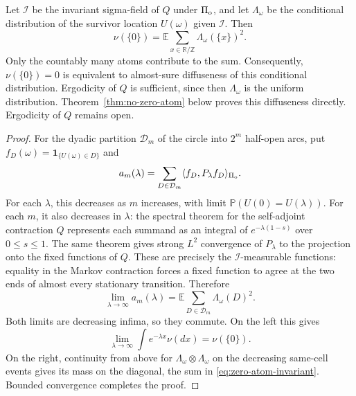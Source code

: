 \documentclass[11pt,letterpaper]{article}
\newcommand{\PP}{\mathbb P}\newcommand{\EE}{\mathbb E}
\newcommand{\T}{\mathbb R/\mathbb Z}\newcommand{\Leb}{\operatorname{Leb}}
\newcommand{\ind}{\mathbf 1}\newcommand{\Exp}{\operatorname{Exp}}
\begin{document}
\begin{corollary}
\label{cor:zero-atom-invariant}
Let $\mathcal I$ be the invariant sigma-field of $Q$ under
$\Pi_{\rm o}$, and let $\Lambda_\omega$ be the conditional distribution
of the survivor location $U(\omega)$ given $\mathcal I$. Then
\begin{equation}\label{eq:zero-atom-invariant}
 \nu(\{0\})=
 \EE\sum_{x\in\T}\Lambda_\omega(\{x\})^2.
\end{equation}
Only the countably many atoms contribute to the sum. Consequently,
$\nu(\{0\})=0$ is equivalent to almost-sure diffuseness of this
conditional distribution. Ergodicity of $Q$ is sufficient, since
then $\Lambda_\omega$ is the uniform distribution.
Theorem~\ref{thm:no-zero-atom} below proves this diffuseness directly.
Ergodicity of $Q$ remains open.
\end{corollary}
\begin{proof}
For the dyadic partition $\mathcal D_m$ of the circle into $2^m$
half-open arcs, put $f_D(\omega)=\ind_{\{U(\omega)\in D\}}$ and
\[
 a_m(\lambda)=\sum_{D\in\mathcal D_m}
                   \langle f_D,P_\lambda f_D\rangle_{\Pi_{\rm o}}.
\]
For each $\lambda$, this decreases as $m$ increases, with limit
$\PP(U(0)=U(\lambda))$. For each $m$, it also decreases in $\lambda$:
the spectral theorem for the self-adjoint contraction $Q$ represents
each summand as an integral of $e^{-\lambda(1-s)}$ over $0\le s\le1$.
The same theorem gives strong $L^2$ convergence of $P_\lambda$ to the
projection onto the fixed functions of $Q$. These are precisely the
$\mathcal I$-measurable functions: equality in the Markov contraction
forces a fixed function to agree at the two ends of almost every
stationary transition. Therefore
\[
 \lim_{\lambda\to\infty}a_m(\lambda)
       =\EE\sum_{D\in\mathcal D_m}\Lambda_\omega(D)^2.
\]
Both limits are decreasing infima, so they commute. On the left this gives
\[
 \lim_{\lambda\to\infty}\int e^{-\lambda x}\nu(dx)=\nu(\{0\}).
\]
On the right, continuity from above for
$\Lambda_\omega\otimes\Lambda_\omega$ on the decreasing same-cell
events gives its mass on the diagonal, the sum in
\eqref{eq:zero-atom-invariant}. Bounded convergence completes the proof.
\end{proof}
\end{document}
